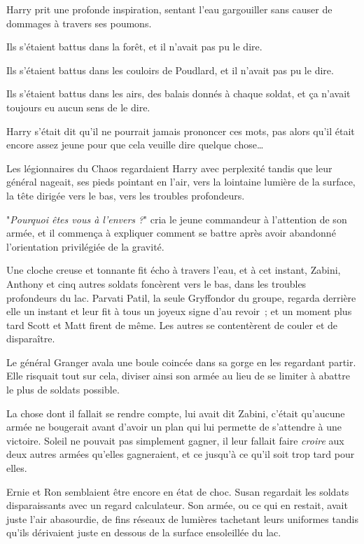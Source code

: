 \later

Harry prit une profonde inspiration, sentant l'eau gargouiller sans causer de dommages à travers ses poumons.

Ils s'étaient battus dans la forêt, et il n'avait pas pu le dire.

Ils s'étaient battus dans les couloirs de Poudlard, et il n'avait pas pu le dire.

Ils s'étaient battus dans les airs, des balais donnés à chaque soldat, et ça n'avait toujours eu aucun sens de le dire.

Harry s'était dit qu'il ne pourrait jamais prononcer ces mots, pas alors qu'il était encore assez jeune pour que cela veuille dire quelque chose…

Les légionnaires du Chaos regardaient Harry avec perplexité tandis que leur général nageait, ses pieds pointant en l'air, vers la lointaine lumière de la surface, la tête dirigée vers le bas, vers les troubles profondeurs.

"\emph{Pourquoi êtes vous à l'envers} \emph{?}" cria le jeune commandeur à l'attention de son armée, et il commença à expliquer comment se battre après avoir abandonné l'orientation privilégiée de la gravité.

\later

Une cloche creuse et tonnante fit écho à travers l'eau, et à cet instant, Zabini, Anthony et cinq autres soldats foncèrent vers le bas, dans les troubles profondeurs du lac. Parvati Patil, la seule Gryffondor du groupe, regarda derrière elle un instant et leur fit à tous un joyeux signe d'au revoir~; et un moment plus tard Scott et Matt firent de même. Les autres se contentèrent de couler et de disparaître.

Le général Granger avala une boule coincée dans sa gorge en les regardant partir. Elle risquait tout sur cela, diviser ainsi son armée au lieu de se limiter à abattre le plus de soldats possible.

La chose dont il fallait se rendre compte, lui avait dit Zabini, c'était qu'aucune armée ne bougerait avant d'avoir un plan qui lui permette de s'attendre à une victoire. Soleil ne pouvait pas simplement gagner, il leur fallait faire \emph{croire} aux deux autres armées qu'elles gagneraient, et ce jusqu'à ce qu'il soit trop tard pour elles.

Ernie et Ron semblaient être encore en état de choc. Susan regardait les soldats disparaissants avec un regard calculateur. Son armée, ou ce qui en restait, avait juste l'air abasourdie, de fins réseaux de lumières tachetant leurs uniformes tandis qu'ils dérivaient juste en dessous de la surface ensoleillée du lac.

